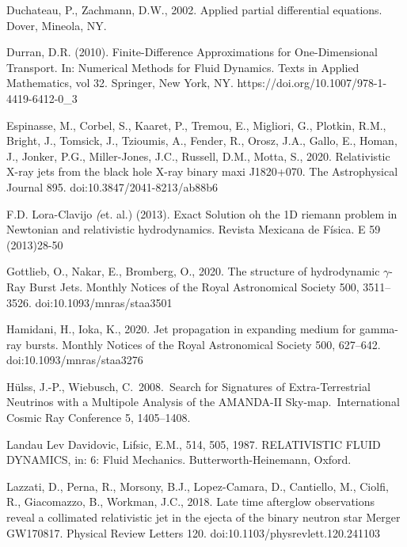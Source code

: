 \documentclass[12pt,a4paper]{book}
\begin{document}
\begin{thebibliography}{40}
Duchateau, P., Zachmann, D.W., 2002. Applied partial differential equations. Dover, Mineola, NY.

Durran, D.R. (2010). Finite-Difference Approximations for One-Dimensional Transport. In: Numerical Methods for Fluid Dynamics. Texts in Applied Mathematics, 
vol 32. Springer, New York, NY. https://doi.org/10.1007/978-1-4419-6412-0\_3

 Espinasse, M., Corbel, S., Kaaret, P., Tremou, E., Migliori, G., Plotkin, R.M., Bright, J., Tomsick, J., Tzioumis, A., Fender, R., Orosz, J.A., Gallo, E., Homan, J., 
Jonker, P.G., Miller-Jones, J.C., Russell, D.M., Motta, S., 2020. Relativistic X-ray jets from the black hole X-ray binary maxi J1820+070. The Astrophysical Journal 895. doi:10.3847/2041-8213/ab88b6 

F.D. Lora-Clavijo \emph(et. al.) (2013). Exact Solution oh the 1D riemann problem in Newtonian and relativistic hydrodynamics. Revista Mexicana de Física. E 59 (2013)28-50 

 Gottlieb, O., Nakar, E., Bromberg, O., 2020. The structure of hydrodynamic $\gamma$-Ray Burst Jets. Monthly Notices of the Royal Astronomical Society 500, 3511–3526. 
doi:10.1093/mnras/staa3501 

 Hamidani, H., Ioka, K., 2020. Jet propagation in expanding medium for gamma-ray bursts. Monthly Notices of the Royal Astronomical Society 500, 627–642. doi:10.1093/mnras/staa3276 

 H{\"u}lss, J.-P., Wiebusch, C.\ 2008.\ Search for Signatures of Extra-Terrestrial Neutrinos with a Multipole Analysis of the AMANDA-II 
Sky-map.\ International Cosmic Ray Conference 5, 1405–1408.

Landau Lev Davidovic, Lifsic, E.M., 514, 505, 1987. RELATIVISTIC FLUID DYNAMICS, in: 6: Fluid Mechanics. Butterworth-Heinemann, Oxford.

 Lazzati, D., Perna, R., Morsony, B.J., Lopez-Camara, D., Cantiello, M., Ciolfi, R., Giacomazzo, B., Workman, J.C., 2018. Late time afterglow observations reveal a 
collimated relativistic jet in the ejecta of the binary neutron star Merger GW170817. Physical Review Letters 120. doi:10.1103/physrevlett.120.241103 


\end{thebibliography}
\end{document}

